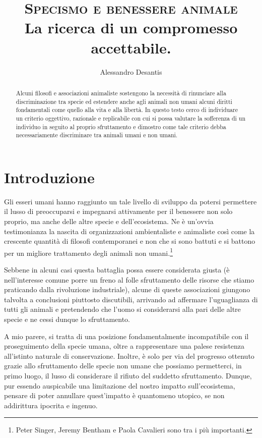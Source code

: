 \documentclass[a4paper,11pt,oneside,article]{memoir}
\title{\textsc{Specismo e benessere animale} \\ \vspace{1mm} \small{La ricerca di un compromesso accettabile.}}
\author{Alessandro Desantis}
\date{}
\begin{document}
\maketitle

\begin{abstract}

\noindent Alcuni filosofi e associazioni animaliste sostengono la necessità di
rinunciare alla discriminazione tra specie ed estendere anche agli animali non
umani alcuni diritti fondamentali come quello alla vita e alla libertà. In
questo testo cerco di individuare un criterio oggettivo, razionale e replicabile
con cui si possa valutare la sofferenza di un individuo in seguito al proprio
sfruttamento e dimostro come tale criterio debba necessariamente discriminare
tra animali umani e non umani.

\end{abstract}

\chapter{Introduzione}

Gli esseri umani hanno raggiunto un tale livello di sviluppo da potersi
permettere il lusso di preoccuparsi e impegnarsi attivamente per il benessere
non solo proprio, ma anche delle altre specie e dell'ecosistema. Ne è un'ovvia
testimonianza la nascita di organizzazioni ambientaliste e animaliste così come
la crescente quantità di filosofi contemporanei e non che si sono battuti e si
battono per un migliore trattamento degli animali non umani.\footnote{Peter
Singer, Jeremy Bentham e Paola Cavalieri sono tra i più importanti.}

Sebbene in alcuni casi questa battaglia possa essere considerata giusta (è
nell'interesse comune porre un freno al folle sfruttamento delle risorse che
stiamo praticando dalla rivoluzione industriale), alcune di queste associazioni
giungono talvolta a conclusioni piuttosto discutibili, arrivando ad affermare
l'uguaglianza di tutti gli animali e pretendendo che l'uomo si considerarsi alla
pari delle altre specie e ne cessi dunque lo sfruttamento.

A mio parere, si tratta di una posizione fondamentalmente incompatibile con il
proseguimento della specie umana, oltre a rappresentare una palese resistenza
all'istinto naturale di conservazione. Inoltre, è solo per via del progresso
ottenuto grazie allo sfruttamento delle specie non umane che possiamo
permetterci, in primo luogo, il lusso di considerare il rifiuto del suddetto
sfruttamento. Dunque, pur essendo auspicabile una limitazione del nostro impatto
sull'ecosistema, pensare di poter annullare quest'impatto è quantomeno utopico,
se non addirittura ipocrita e ingenuo.
\end{document}
